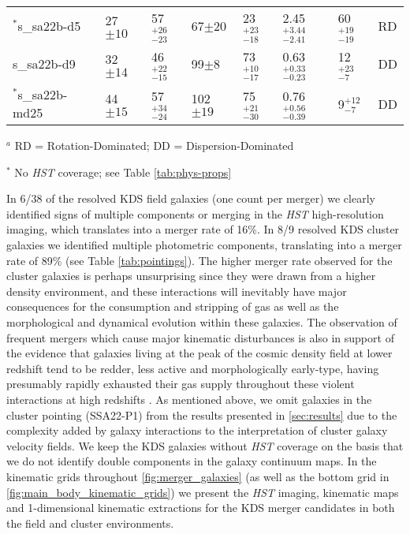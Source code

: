 \documentclass[fleqn,usenatbib]{mnras}
\begin{document}
\begin{table*}
\begin{threeparttable}
\begin{tabular}{llllllll}
$^{*}$s\_sa22b-d5     & 27$\pm10$                    & 57$^{+26}_{-23}$                     & 67$\pm20$                  & 23$^{+23}_{-18}$          & 2.45$^{+3.44}_{-2.41}$               & 60$^{+19}_{-19}$ & RD   \\[1ex]
s\_sa22b-d9     & 32$\pm14$                    & 46$^{+22}_{-15}$                     & 99$\pm8$                  & 73$^{+10}_{-17}$             & 0.63$^{+0.33}_{-0.23}$                 & 12$^{+23}_{-7}$ & DD   \\[1ex]
$^{*}$s\_sa22b-md25   & 44$\pm15$           & 57$^{+34}_{-24}$                     & 102$\pm19$   & 75$^{+21}_{-30}$                   & 0.76$^{+0.56}_{-0.39}$                & 9$^{+12}_{-7}$ & DD

\end{tabular}
\begin{tablenotes}
      \small
      \item $^{a}$ RD = Rotation-Dominated; DD = Dispersion-Dominated
      \item $^{*}$ No {\em HST} coverage; see Table \ref{tab:phys-props}
    \end{tablenotes}
  \end{threeparttable}
  \end{table*}

In 6/38 of the resolved KDS field galaxies (one count per merger) we clearly identified signs of multiple components or merging in the {\em HST} high-resolution imaging, which translates into a merger rate of 16\%.
In 8/9 resolved KDS cluster galaxies we identified multiple photometric components, translating into a merger rate of 89\%  (see Table \ref{tab:pointings}).
The higher merger rate observed for the cluster galaxies is perhaps unsurprising since they were drawn from a higher density environment, and these interactions will inevitably have major consequences for the consumption and stripping of gas as well as the morphological and dynamical evolution within these galaxies.
The observation of frequent mergers which cause major kinematic disturbances is also in support of the evidence that galaxies living at the peak of the cosmic density field at lower redshift tend to be redder, less active and morphologically early-type, having presumably rapidly exhausted their gas supply throughout these violent interactions at high redshifts \citep[e.g.][]{Steidel1998,White2007,Kodama2007,Zheng2009}.
As mentioned above, we omit galaxies in the cluster pointing (SSA22-P1) from the results presented in \cref{sec:results} due to the complexity added by galaxy interactions to the interpretation of cluster galaxy velocity fields.
We keep the KDS galaxies without {\em HST} coverage on the basis that we do not identify double components in the galaxy continuum maps. 
In the kinematic grids throughout \ref{fig:merger_galaxies} (as well as the bottom grid in \ref{fig:main_body_kinematic_grids}) we present the {\em HST} imaging, kinematic maps and 1-dimensional kinematic extractions for the KDS merger candidates in both the field and cluster environments.
\end{document}
